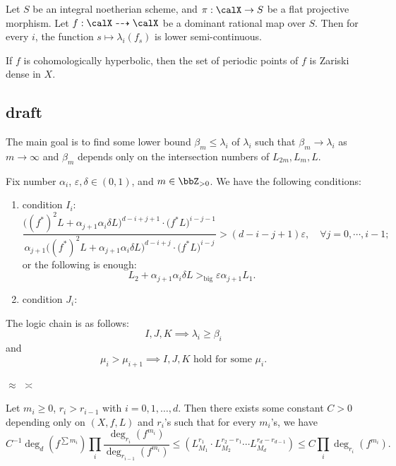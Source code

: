   \begin{mainthm}\label{mainthm:semi-continuity}
    Let $S$ be an integral noetherian scheme, and $\pi: \calX \to S$ be a flat projective morphism. 
    Let $f: \calX \dashrightarrow \calX$ be a dominant rational map over $S$.
    Then for every $i$, the function $s \mapsto \lambda_i(f_s)$ is lower semi-continuous.
  \end{mainthm}

  \begin{mainthm}
    If $f$ is cohomologically hyperbolic, then the set of periodic points of $f$ is Zariski dense in $X$.
  \end{mainthm}


\subsection{draft}


  The main goal is to find some lower bound $\beta_m \leq \lambda_i$ of $\lambda_i$ such that $\beta_m \to \lambda_i$ as $m \to \infty$ and $\beta_m$ depends only on the intersection numbers of $L_{2m}, L_m, L$.


  Fix number $\alpha_i$, $\varepsilon, \delta \in (0, 1)$, and $m \in \bbZ_{>0}$. 
  We have the following conditions:
  \begin{enumerate}
    \item condition $I_i$:
      \[ \frac{\bigl((f^*)^2L+\alpha_{j+1}\alpha_{i}\delta L\bigr)^{d-i+j+1} \cdot \bigl(f^*L\bigr)^{i-j-1}}{\alpha_{j+1}\bigl((f^*)^2L+\alpha_{j+1}\alpha_{i}\delta L\bigr)^{d-i+j} \cdot \bigl(f^*L\bigr)^{i-j}} > (d-i-j+1) \varepsilon, \quad \forall j = 0,\cdots, i-1;\]
      or the following is enough:
      \[ L_2 + \alpha_{j+1}\alpha_{i}\delta L >_{\text{big}} \varepsilon \alpha_{j+1} L_1. \]
    \item condition $J_i$:
  \end{enumerate}


  The logic chain is as follows:
  \[ I,J,K \implies \lambda_i \geq \beta_i \]
  and 
  \[ \mu_i > \mu_{i+1} \implies I,J,K \text{ hold for some } \mu_i. \]

  $\approx$ $\asymp$


  \begin{proposition}
    \Yang{}
    Let $m_i \geq 0$, $r_i > r_{i-1}$ with $i = 0, 1, \ldots, d$.
    Then there exists some constant $C > 0$ depending only on $(X,f,L)$ and $r_i$'s such that for every $m_i$'s, we have
    \[ C^{-1} \deg_d(f^{\sum m_i}) \prod_i \frac{\deg_{r_i}(f^{m_i})}{\deg_{r_{i-1}}(f^{m_i})} \leq (L_{M_1}^{r_1} \cdot L_{M_2}^{r_2 - r_1} \cdots L_{M_d}^{r_d - r_{d-1}}) \leq C \prod_i \deg_{r_i}(f^{m_i}). \]
  \end{proposition}


